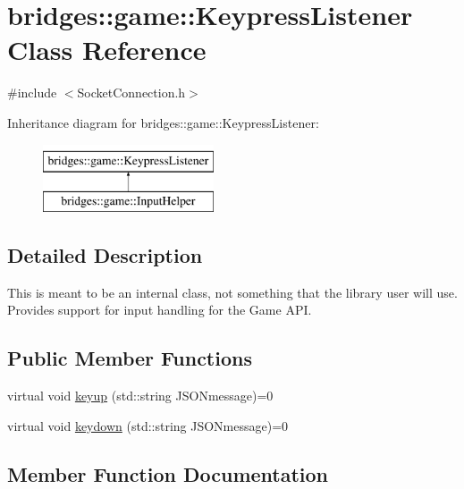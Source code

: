 \hypertarget{classbridges_1_1game_1_1_keypress_listener}{}\section{bridges\+:\+:game\+:\+:Keypress\+Listener Class Reference}
\label{classbridges_1_1game_1_1_keypress_listener}


{\ttfamily \#include $<$Socket\+Connection.\+h$>$}

Inheritance diagram for bridges\+:\+:game\+:\+:Keypress\+Listener\+:\begin{figure}[H]
\begin{center}
\leavevmode
\includegraphics[height=2.000000cm]{classbridges_1_1game_1_1_keypress_listener}
\end{center}
\end{figure}


\subsection{Detailed Description}
This is meant to be an internal class, not something that the library user will use. Provides support for input handling for the Game A\+PI. \subsection*{Public Member Functions}
\begin{DoxyCompactItemize}
\item 
virtual void \hyperlink{classbridges_1_1game_1_1_keypress_listener_a21d9f085819e30c41f3964ea2276964d}{keyup} (std\+::string J\+S\+O\+Nmessage)=0
\item 
virtual void \hyperlink{classbridges_1_1game_1_1_keypress_listener_a79362f390cad37bfe73012a05599e8aa}{keydown} (std\+::string J\+S\+O\+Nmessage)=0
\end{DoxyCompactItemize}


\subsection{Member Function Documentation}
\mbox{\label{classbridges_1_1game_1_1_keypress_listener_a79362f390cad37bfe73012a05599e8aa}} 
